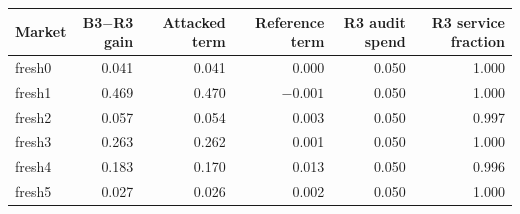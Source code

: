 \begin{tabular}{@{}lrrrrr@{}}\toprule
Market & B3$-$R3 gain & Attacked term & Reference term & R3 audit spend & R3 service fraction \\\midrule
fresh0 & 0.041 & 0.041 & 0.000 & 0.050 & 1.000 \\
fresh1 & 0.469 & 0.470 & \ensuremath{-0.001} & 0.050 & 1.000 \\
fresh2 & 0.057 & 0.054 & 0.003 & 0.050 & 0.997 \\
fresh3 & 0.263 & 0.262 & 0.001 & 0.050 & 1.000 \\
fresh4 & 0.183 & 0.170 & 0.013 & 0.050 & 0.996 \\
fresh5 & 0.027 & 0.026 & 0.002 & 0.050 & 1.000 \\
\bottomrule\end{tabular}
